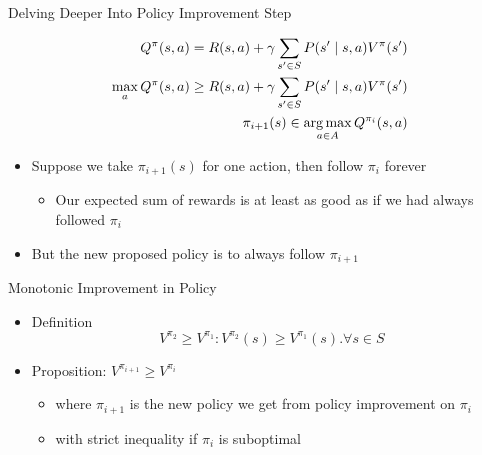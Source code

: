 \documentclass[aspectratio=169]{../latex_main/tntbeamer}  %
\begin{document}
\begin{frame}[c]{Delving Deeper Into Policy Improvement Step}

\begin{eqnarray}
Q^\pi(s,a) = R(s,a) + \gamma \sum_{s' \in S} P(s' \mid s,a) V^\pi(s')\nonumber\\
\max_a Q^\pi(s,a) \geq R(s,a) + \gamma \sum_{s' \in S} P(s' \mid s,a) V^\pi(s') \nonumber\\
\pi_{i+1}(s) \in \operatorname*{arg\,max}_{a\in A} Q^{\pi_i} (s,a)\nonumber
\end{eqnarray}

\begin{itemize}
	\item Suppose we take $\pi_{i+1}(s)$ for one action, then follow $\pi_i$ forever
	\begin{itemize}
		\item Our expected sum of rewards is at least as good as if we had always
		followed $\pi_i$
	\end{itemize}
	\item But the new proposed policy is to always follow $\pi_{i+1}$
\end{itemize}

\end{frame}
\begin{frame}[c]{Monotonic Improvement in Policy}

\begin{itemize}
	\item  Definition
	$$ V^{\pi_2} \geq V^{\pi_1}: V^{\pi_2}(s) \geq V^{\pi_1}(s). \forall s \in S $$
	\item Proposition: $V^{\pi_{i+1}} \geq V^{\pi_{i}}$
	\begin{itemize}
		\item where $\pi_{i+1}$ is the new policy we get from policy improvement on $\pi_i$
		\item with strict inequality if $\pi_i$ is suboptimal
	\end{itemize} 
\end{itemize}

\end{frame}
\end{document}
